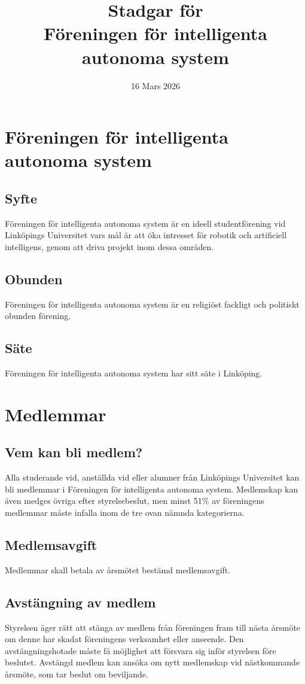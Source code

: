 \documentclass[11pt,a4paper]{article}
\title{Stadgar för\\Föreningen för intelligenta autonoma system}
\date{16 Mars 2026}
\begin{document}
\maketitle

\section{Föreningen för intelligenta autonoma system}

\subsection{Syfte}
Föreningen för intelligenta autonoma system är en ideell studentförening vid Linköpings Universitet vars mål är att öka intresset för robotik och artificiell intelligens, genom att driva projekt inom dessa områden. 
\subsection{Obunden}
Föreningen för intelligenta autonoma system är en religiöst fackligt och
politiskt obunden förening.
\subsection{Säte}
Föreningen för intelligenta autonoma system har sitt säte i Linköping.

\section{Medlemmar}

\subsection{Vem kan bli medlem?}
Alla studerande vid, anställda vid eller alumner från Linköpings Universitet kan bli medlemmar i Föreningen för intelligenta autonoma system. Medlemskap kan även medges övriga efter styrelsebeslut, men minst 51\% av föreningens medlemmar måste infalla inom de tre ovan nämnda kategorierna. 
\subsection{Medlemsavgift}
Medlemmar skall betala av årsmötet bestämd medlemsavgift.
\subsection{Avstängning av medlem}
Styrelsen äger rätt att stänga av medlem från föreningen fram till nästa årsmöte om denne har skadat föreningens verksamhet eller anseende. Den avstängningshotade måste få möjlighet att försvara sig inför styrelsen före beslutet. Avstängd medlem kan ansöka om nytt medlemskap vid nästkommande årsmöte, som tar beslut om beviljande.
\end{document}
